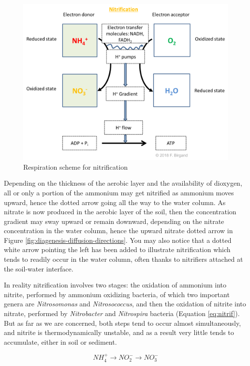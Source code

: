 \documentclass[]{book}
\theoremstyle{definition}
\theoremstyle{definition}
\theoremstyle{definition}
\theoremstyle{remark}
\begin{document}
\begin{figure}

{\centering \includegraphics[width=0.75\linewidth]{pictures/respiration-NH4-O2} 

}

\caption{Respiration scheme for nitrification}\label{fig:respiration-NH4-O2}
\end{figure}

Depending on the thickness of the aerobic layer and the availability of
dioxygen, all or only a portion of the ammonium may get nitrified as
ammonium moves upward, hence the dotted arrow going all the way to the
water column. As nitrate is now produced in the aerobic layer of the
soil, then the concentration gradient may sway upward or remain
downward, depending on the nitrate concentration in the water column,
hence the upward nitrate dotted arrow in Figure
\ref{fig:diagenesis-diffusion-directions}. You may also notice that a
dotted white arrow pointing the left has been added to illustrate
nitrification which tends to readily occur in the water column, often
thanks to nitrifiers attached at the soil-water interface.

In reality nitrification involves two stages: the oxidation of ammonium
into nitrite, performed by ammonium oxidizing bacteria, of which two
important genera are \emph{Nitrosomonas} and \emph{Nitrosococcus}, and
then the oxidation of nitrite into nitrate, performed by
\emph{Nitrobacter} and \emph{Nitrospira} bacteria (Equation
\eqref{eq:nitrif}). But as far as we are concerned, both steps tend to
occur almost simultaneously, and nitrite is thermodynamically unstable,
and as a result very little tends to accumulate, either in soil or
sediment.

\begin{equation}
NH_4^+ \rightarrow NO_2^- \rightarrow NO_3^-
\label{eq:nitrif}
\end{equation}
\end{document}
